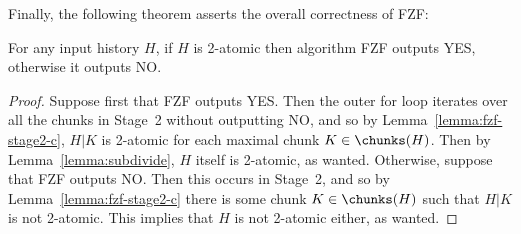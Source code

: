 Finally, the following theorem asserts the overall correctness of FZF:

\begin{theorem}
\label{theorem:fzf-stage2}
For any input history $H$, if $H$ is 2-atomic then algorithm FZF outputs YES, otherwise it outputs NO.
\begin{proof}
Suppose first that FZF outputs YES.
Then the outer for loop iterates over all the chunks in Stage~2 without outputting NO, and so
by Lemma~\ref{lemma:fzf-stage2-c}, $H|K$ is 2-atomic for each maximal chunk $K \in \chunks(H)$.
Then by Lemma~\ref{lemma:subdivide}, $H$ itself is 2-atomic, as wanted.
Otherwise, suppose that FZF outputs NO.
Then this occurs in Stage~2, and so by Lemma~\ref{lemma:fzf-stage2-c} there is some chunk
$K \in \chunks(H)$ such that $H|K$ is not 2-atomic.
This implies that $H$ is not 2-atomic either, as wanted.
\end{proof}
\end{theorem}


